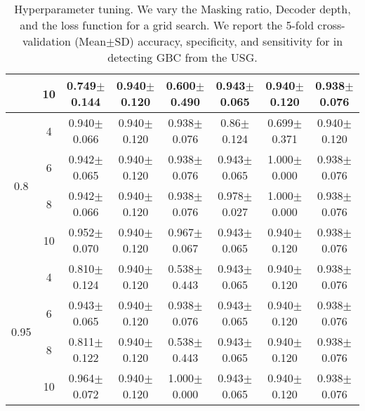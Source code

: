 \begin{table}[!t]
{\begin{tabular}{cccccccc}
        & 10 & 0.749$\pm$0.144 & 0.940$\pm$0.120 & 0.600$\pm$0.490  & 0.943$\pm$0.065 & 0.940$\pm$0.120 & 0.938$\pm$0.076  \\
        \midrule 
		\multirow{4}{*}{0.8}
		& 4 & 0.940$\pm$0.066  & 0.940$\pm$0.120& 0.938$\pm$0.076 & 0.86$\pm$0.124 & 0.699$\pm$0.371 & 0.940$\pm$0.120 \\
        & 6 & 0.942$\pm$0.065  & 0.940$\pm$0.120 & 0.938$\pm$0.076 & 0.943$\pm$0.065 & 1.000$\pm$0.000 & 0.938$\pm$0.076 \\
        & 8 & 0.942$\pm$0.066 & 0.940$\pm$0.120 & 0.938$\pm$0.076 & 0.978$\pm$0.027 & 1.000$\pm$0.000 & 0.938$\pm$0.076\\
        & 10 & 0.952$\pm$0.070 & 0.940$\pm$0.120 & 0.967$\pm$0.067 & 0.943$\pm$0.065 & 0.940$\pm$0.120 & 0.938$\pm$0.076 \\
        \midrule 
        \multirow{4}{*}{0.95}
		& 4 & 0.810$\pm$0.124 &0.940$\pm$0.120& 0.538$\pm$0.443 & 0.943$\pm$0.065 &0.940$\pm$0.120 & 0.938$\pm$0.076 \\
        & 6 & 0.943$\pm$0.065 & 0.940$\pm$0.120 & 0.938$\pm$0.076& 0.943$\pm$0.065 & 0.940$\pm$0.120 & 0.938$\pm$0.076 \\
        & 8 & 0.811$\pm$0.122&0.940$\pm$0.120 & 0.538$\pm$0.443 & 0.943$\pm$0.065 & 0.940$\pm$0.120 & 0.938$\pm$0.076 \\
        & 10 & 0.964$\pm$0.072 & 0.940$\pm$0.120 & 1.000$\pm$0.000 & 0.943$\pm$0.065& 0.940$\pm$0.120 & 0.938$\pm$0.076 \\
		\bottomrule
	\end{tabular}
	}
	\caption[Hyperparameter tuning of \focusmae]{Hyperparameter tuning. We vary the Masking ratio, Decoder depth, and the loss function for a grid search. We report the 5-fold cross-validation (Mean$\pm$SD) accuracy, specificity, and sensitivity for \focusmae in detecting GBC from the USG.}
	\label{focusmae_tab:hyperparam_supp}
\end{table}
